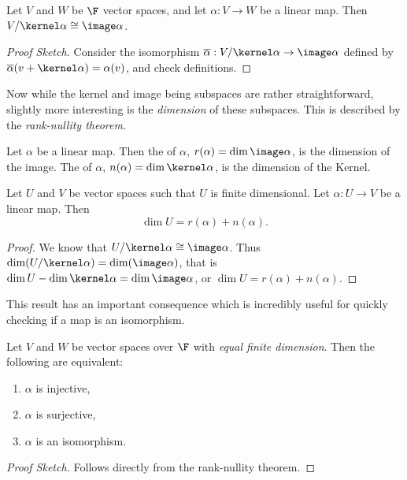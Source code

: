 \documentclass[a4paper]{scrartcl}
\begin{document}
\begin{theorem}
    Let $V$ and $W$ be $\F$ vector spaces, and let $\alpha: V \rightarrow W$ be a linear map. Then $V/\kernel \alpha \cong \image \alpha$.
\end{theorem}
\begin{proof}[Proof Sketch]
    Consider the isomorphism $\overline{\alpha} : V/\kernel \alpha \rightarrow \image \alpha$ defined by $\overline{\alpha}(v + \kernel \alpha) = \alpha(v)$, and check definitions.
\end{proof}

Now while the kernel and image being subspaces are rather straightforward, slightly more interesting is the \emph{dimension} of these subspaces. This is described by the \emph{rank-nullity theorem}.

\begin{definition}
    Let $\alpha$ be a linear map. Then the  of $\alpha$, $r(\alpha) = \dim \image \alpha$, is the dimension of the image. The  of $\alpha$, $n(\alpha) = \dim \kernel \alpha$, is the dimension of the Kernel.
\end{definition}

\begin{theorem}
    Let $U$ and $V$ be vector spaces such that $U$ is finite dimensional.
    Let $\alpha: U \rightarrow V$ be a linear map. Then
    $$
    \dim U = r(\alpha) + n(\alpha).
    $$
\end{theorem}
\begin{proof}
    We know that $U/\kernel \alpha \cong \image \alpha$. Thus $\dim (U / \kernel \alpha) = \dim (\image \alpha)$, that is $\dim U - \dim \kernel \alpha = \dim \image \alpha$, or $\dim U = r(\alpha) + n(\alpha)$.
\end{proof}

This result has an important consequence which is incredibly useful for quickly checking if a map is an isomorphism.

\begin{lemma}
    Let $V$ and $W$ be vector spaces over $\F$ with \emph{equal finite dimension}. Then the following are equivalent: 
    \begin{enumerate}[label=(\roman*)]
        \item $\alpha$ is injective,
        \item $\alpha$ is surjective,
        \item $\alpha$ is an isomorphism.
    \end{enumerate}
\end{lemma}
\begin{proof}[Proof Sketch]
    Follows directly from the rank-nullity theorem.
\end{proof}
\end{document}
